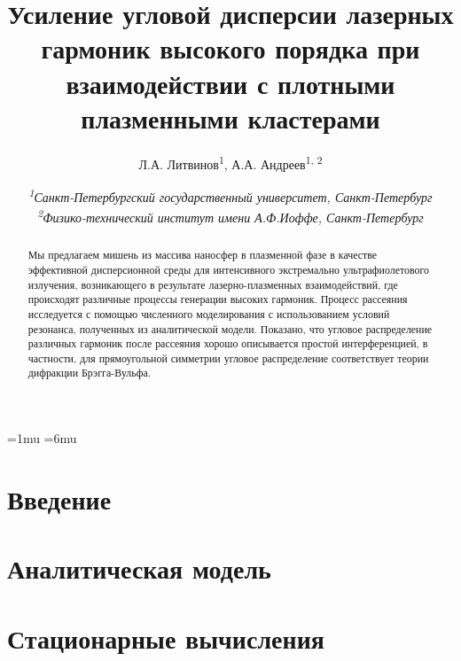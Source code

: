 \documentclass[10pt]{article}
\begin{document}



	\pagestyle{fancy}
	\fancyhf{}
	\fancyhead[L]{\textit{\nouppercase{\leftmark}}}
	\fancyfoot[C]{\thepage}

	\thinmuskip=1mu
	\thickmuskip=6mu
	\def\stacktype{S}\Sstackgap=-4.3pt
	\captionsetup[subfigure]{margin=0.05\textwidth}


	\newcommand{\subfigureautorefname}{\figureautorefname}
	\renewcommand{\thesubfigure}{\asbuk{subfigure}}


	\title{Усиление угловой дисперсии лазерных гармоник высокого порядка при взаимодействии с плотными плазменными кластерами}
	\author{
		Л.А. Литвинов\textsuperscript{1}, А.А. Андреев\textsuperscript{1, 2}
	}
	\date{
		\normalsize{\textit{\textsuperscript{1}Санкт-Петербургский государственный университет, Санкт-Петербург \\ \textsuperscript{2}Физико-технический институт имени А.Ф.Иоффе, Санкт-Петербург}}
	}
	\maketitle

	\begin{abstract}
		Мы предлагаем мишень из массива наносфер в плазменной фазе в качестве эффективной дисперсионной среды для интенсивного экстремально ультрафиолетового излучения, возникающего в результате лазерно-плазменных взаимодействий, где происходят различные процессы генерации высоких гармоник. Процесс рассеяния исследуется с помощью численного моделирования с использованием условий резонанса, полученных из аналитической модели. Показано, что угловое распределение различных гармоник после рассеяния хорошо описывается простой интерференцией, в частности, для прямоугольной симметрии угловое распределение соответствует теории дифракции Брэгга-Вульфа.
	\end{abstract}

	\section{Введение}
	\section{Аналитическая модель}
	\section{Стационарные вычисления}
	
	
	
	

	\newpage
	
	
\end{document}
